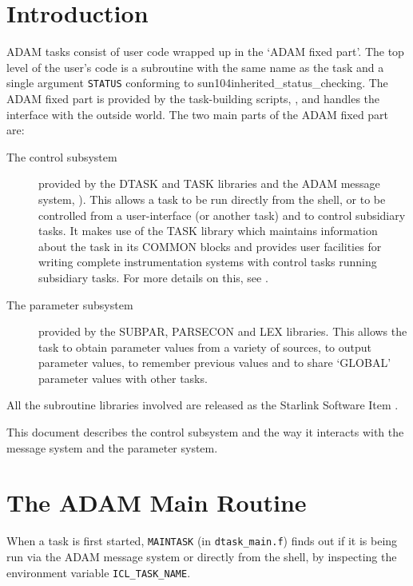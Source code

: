 \documentclass[twoside,11pt,nolof]{starlink}
\begin{document}
\scfrontmatter

\section{Introduction}
ADAM tasks consist of user code wrapped up in the `ADAM fixed part'.
The top level of the user's code is a subroutine with the same name as the
task and a single argument \texttt{STATUS} conforming to
{sun104}{inherited_status_checking}.
The ADAM fixed part is provided by the task-building scripts,
,
and handles the interface with the outside world. The two main parts of the
ADAM fixed part are:
\begin{description}
\item[The control subsystem]
provided by the DTASK and TASK libraries and the ADAM message system,
).
This allows a task to be run directly from the shell, or to
be controlled from a user-interface (or another task) and to control
subsidiary tasks. It makes use of the TASK library which
maintains information about the task in its COMMON blocks and provides user
facilities for writing complete instrumentation systems with control tasks
running subsidiary tasks. For more details on this, see
.
\item[The parameter subsystem] provided by the SUBPAR, PARSECON and LEX
libraries. This allows the task to obtain parameter
values from a variety of sources, to output parameter values, to remember
previous values and to share `GLOBAL' parameter values with other tasks.
 \end{description}
All the subroutine libraries involved are released as the Starlink Software
Item
.

This document describes the control subsystem and the way it interacts with the
message system and the parameter system.

\section{\label{the_adam_main_routine}The ADAM Main Routine}
When a task is first started, \texttt{MAINTASK} (in \texttt{dtask\_main.f})
finds out if it is being run via the ADAM message system or directly from the
shell, by inspecting the environment variable \texttt{ICL\_TASK\_NAME}.
\end{document}
